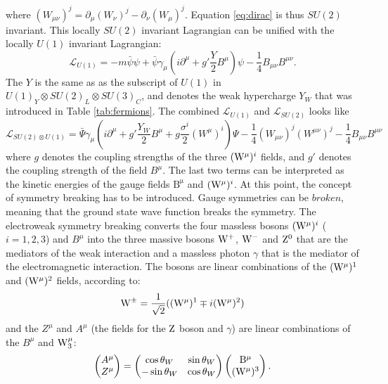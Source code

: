 where $(W_{\mu\nu})^{j}=\partial_{\mu}(W_{\nu})^{j}-\partial_{\nu}(W_{\mu})^{j}$. 
Equation \ref{eq:dirac} is thus $SU(2)$ invariant.  
This locally $SU(2)$ invariant Lagrangian can be unified with the locally $U(1)$ invariant Lagrangian:
\begin{equation}
\mathcal{L}_{U(1)}=-m\bar{\psi}\psi+\bar{\psi}\gamma_{\mu}(i\partial^{\mu}+g'\frac{Y}{2}B^{\mu})\psi-\frac{1}{4}B_{\mu\nu}B^{\mu\nu}.
\end{equation}                                               
The $Y$ is the same as as the subscript of $U(1)$ in $U(1)_{Y}\otimes SU(2)_{L}\otimes SU(3)_{C}$, and denotes the weak hypercharge $Y_{W}$ that was introduced in Table \ref{tab:fermions}. 
The combined $\mathcal{L}_{U(1)}$ and $\mathcal{L}_{SU(2)}$ looks like
\begin{equation}
\mathcal{L}_{SU(2)\otimes U(1)}=\bar{\Psi}\gamma_{\mu}(i\partial^{\mu}+g'\frac{Y_{W}}{2}B^{\mu}+g\frac{\sigma^{i}}{2}(W^{\mu})^{i})\Psi-\frac{1}{4}(W_{\mu\nu})^{j}(W^{\mu\nu})^{j}-\frac{1}{4}B_{\mu\nu}B^{\mu\nu} 
\label{eq:ewkLagrange}
\end{equation}                                                
where $g$ denotes the coupling strengths of the three $(\mathrm{W}^{\mu})^{i}$ fields, and $g'$ denotes the coupling strength of the field $B^{\mu}$. 
The last two terms can be interpreted as the kinetic energies of the gauge fields $\mathrm{B^{\mu}}$ and $(\mathrm{W}^{\mu})^{i}$.
At this point, the concept of symmetry breaking has to be introduced. 
Gauge symmetries can be $broken$, meaning that the ground state wave function breaks the symmetry. 
The electroweak symmetry breaking converts the four massless bosons $(\mathrm{W}^{\mu})^{i}$ ($i=1,2,3$) and $B^{\mu}$ into the three massive bosons $\mathrm{W}^{+}$, $\mathrm{W}^{-}$ and $\mathrm{Z}^{0}$ that are the mediators of the weak interaction and a massless photon $\gamma$ that is the mediator of the electromagnetic interaction. 
The \PW bosons are linear combinations of the $(\mathrm{W}^{\mu})^{1}$ and $(\mathrm{W}^{\mu})^{2}$  fields, according to:
\begin{equation} 
\mathrm{W}^{\pm}=\frac{1}{\sqrt{2}}((\mathrm{W}^{\mu})^{1}\mp i(\mathrm{W}^{\mu})^{2})
\label{eq:Widentities}
\end{equation} 
and the $Z^{\mu}$ and $A^{\mu}$ (the fields for the $\mathrm{Z}$ boson and $\gamma$) are linear combinations of the $B^{\mu}$ and $\mathrm{W}_{3}^{\mu}$: 
\begin{equation} 
\begin{pmatrix} A^{\mu}\\ Z^{\mu}\end{pmatrix}=
\begin{pmatrix} 
    \cos\theta_{W}  & \sin\theta_{W}\\
    -\sin\theta_{W} & \cos\theta_{W}\\
\end{pmatrix}
\begin{pmatrix} \mathrm{B}^{\mu}\\ (\mathrm{W}^{\mu})^{3}\end{pmatrix}.
\label{eq:Zidentities}
\end{equation} 
